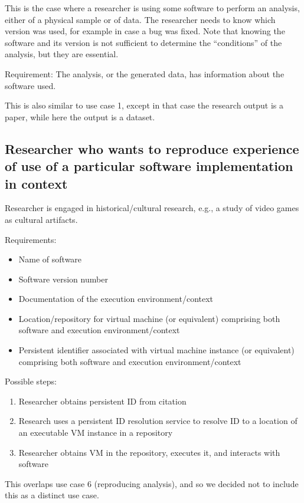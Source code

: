 \documentclass[12pt, oneside]{amsart}
\begin{document}
This is the case where a researcher is using some software to perform an analysis, either of a physical sample or of data.
The researcher needs to know which version was used, for example in case a bug was fixed.
Note that knowing the software and its version is not sufficient to determine the ``conditions'' of the analysis, but they are essential.

Requirement:
The analysis, or the generated data, has information about the software used.

This is also similar to use case 1, except in that case the research output is
a paper, while here the output is a dataset.

\subsection*{Researcher who wants to reproduce experience of use of a particular software implementation in context}

Researcher is engaged in historical/cultural research, e.g., a study of video games as cultural artifacts.

Requirements:
\begin{itemize}
\item Name of software
\item Software version number
\item Documentation of the execution environment/context
\item Location/repository for virtual machine (or equivalent) comprising both software and execution environment/context
\item Persistent identifier associated with virtual machine instance (or equivalent) comprising both software and execution environment/context
\end{itemize}

Possible steps:
\begin{enumerate}
\item Researcher obtains persistent ID from citation
\item Research uses a persistent ID resolution service to resolve ID to a location of  an executable VM instance in a repository
\item Researcher obtains VM in the repository, executes it, and interacts with software
\end{enumerate}

This overlaps use case 6 (reproducing analysis), and so we decided not to
include this as a distinct use case.
\end{document}
